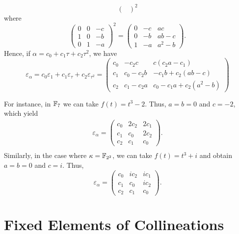 \begin{rem}
$$\begin{pmatrix}
            \end{pmatrix}^{\!\!\!2}
    $$
    where
    $$
        \begin{pmatrix}
            0   &0  &-c\\
            1   &0  &-b\\
            0   &1  &-a
        \end{pmatrix}^{\!\!\!2}
        =
        \begin{pmatrix}
             0 & -c & ac\\
             0 & -b & ab-c\\
             1 & -a & a^2-b 
        \end{pmatrix}.
    $$
    Hence, if $\alpha=c_0+c_1\tau+c_2\tau^2$, we have
    $$
        \varepsilon_\alpha=c_0\varepsilon_1+c_1\varepsilon_\tau
            +c_2\varepsilon_{\tau^2}
            = \begin{pmatrix}
                    c_0 & -c_2c & c(c_2a - c_1) \\
                    c_1 & c_0 - c_2b & -c_1b + c_2(ab-c) \\
                    c_2 & c_1 - c_2a & c_0 - c_1a + c_2(a^2-b)
                \end{pmatrix}
    $$
    
    \small
    For instance, in $\Fq[7]$ we can take $f(t)=t^3-2$. Thus, $a=b=0$ and $c=-2$, which yield
    \begin{align*}
        \varepsilon_\alpha=\begin{pmatrix}
            c_0     &2c_2      &2c_1\\
            c_1     &c_0    &2c_2\\
            c_2     &c_1    &c_0
        \end{pmatrix}.\\
    \end{align*}
    Similarly, in the case where $\kappa=\Fq[2^2]$, we can take $f(t)=t^3+i$ and obtain $a=b=0$ and $c=i$. Thus,
    \[
        \varepsilon_\alpha=\begin{pmatrix}
            c_0     &ic_2       &ic_1\\
            c_1     &c_0        &ic_2\\
            c_2     &c_1        &c_0
        \end{pmatrix}.
    \]

    \normalsize
\end{rem}


\section{Fixed Elements of Collineations}

